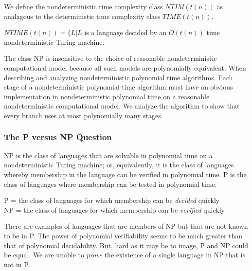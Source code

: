 \documentclass{article}
\begin{document}
We define the nondeterministic time complexity class $NTIM(t(n))$ as analagous to the deterministic time complexity class $TIME(t(n))$. 

\begin{definition}
  $NTIME(t(n)) = \{L|L$ is a language decided by an $O(t(n))$ time nondeterministic Turing machine. 
\end{definition}

The class NP is insensitive to the choice of reasonable nondeterministic computational model because all such models are polynomially equivalent. When describing and analyzing nondeterministic polynomial time algorithms. Each stage of a nondeterministic polynomial time algorithm must have an obvious implementation in nondeterministic polynomial time on a reasonable nondeterministic computational model. We analyze the algorithm to show that every branch uses at most polynomially many stages. 

\subsubsection{The P versus NP Question}

NP is the class of languages that are solvable in polynomial time on a nondeterministic Turing machine; or, equivalently, it is the class of languages whereby membership in the language can be verified in polynomial time. P is the class of languages where membership can be tested in polynomial time. 
\begin{center}
  P = the class of languages for which membership can be \emph{decided} quickly \\ 
  NP = the class of languages for which membership can be \emph{verified} quickly
\end{center}
There are examples of languages that are members of NP but that are not known to be in P. The power of polynomial verifiability seems to be much greater than that of polynomial decidability. But, hard as it may be to image, P and NP could be equal. We are unable to \emph{prove} the existence of a single language in NP that is not in P. 
\end{document}
